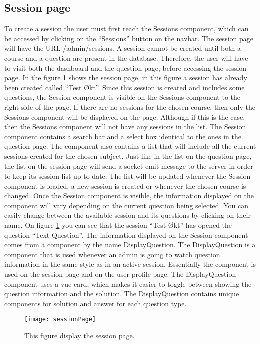 \subsection{Session page}
To create a session the user must first reach the Sessions component, which can be accessed by clicking on the “Sessions” button on the navbar. The session page will have the URL /admin/sessions. A session cannot be created until both a course and a question are present in the database. Therefore, the user will have to visit both the dashboard and the question page, before accessing the session page. In the figure \ref{fig:sessionPage} shows the session page, in this figure a session has already been created called “Test Økt”. Since this session is created and includes some questions, the Session component is visible on the Sessions component to the right side of the page. If there are no sessions for the chosen course, then only the Sessions component will be displayed on the page. Although if this is the case, then the Sessions component will not have any sessions in the list.
The Session component contains a search bar and a select box identical to the ones in the question page. The component also contains a list that will include all the current sessions created for the chosen subject. Just like in the list on the question page, the list on the session page will send a socket emit message to the server in order to keep its session list up to date. The list will be updated whenever the Session component is loaded, a new session is created or whenever the chosen course is changed. Once the Session component is visible, the information displayed on the component will vary depending on the current question being selected. You can easily change between the available session and its questions by clicking on their name. On figure \ref{fig:sessionPage} you can see that the session “Test Økt” has opened the question “Text Question”. 
The information displayed on the Session component comes from a component by the name DisplayQuestion. The DisplayQuestion is a component that is used whenever an admin is going to watch question information in the same style as in an active session. Essentially the component is used on the session page and on the user profile page. The DisplayQuestion component uses a vue card, which makes it easier to toggle between showing the question information and the solution.  The DisplayQuestion contains unique components for solution and answer for each question type. %
\begin{figure}[H]
	\texttt{[image: sessionPage]}
	\caption{This figure display the session page.}
	\label{fig:sessionPage}
\end{figure}